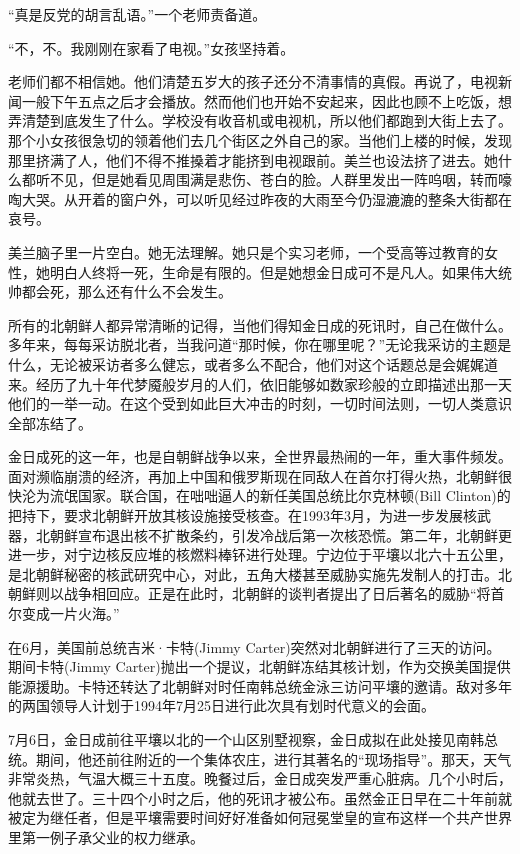 “真是反党的胡言乱语。”一个老师责备道。

“不，不。我刚刚在家看了电视。”女孩坚持着。

老师们都不相信她。他们清楚五岁大的孩子还分不清事情的真假。再说了，电视新闻一般下午五点之后才会播放。然而他们也开始不安起来，因此也顾不上吃饭，想弄清楚到底发生了什么。学校没有收音机或电视机，所以他们都跑到大街上去了。那个小女孩很急切的领着他们去几个街区之外自己的家。当他们上楼的时候，发现那里挤满了人，他们不得不推搡着才能挤到电视跟前。美兰也设法挤了进去。她什么都听不见，但是她看见周围满是悲伤、苍白的脸。人群里发出一阵呜咽，转而嚎啕大哭。从开着的窗户外，可以听见经过昨夜的大雨至今仍湿漉漉的整条大街都在哀号。

美兰脑子里一片空白。她无法理解。她只是个实习老师，一个受高等过教育的女性，她明白人终将一死，生命是有限的。但是她想金日成可不是凡人。如果伟大统帅都会死，那么还有什么不会发生。

所有的北朝鲜人都异常清晰的记得，当他们得知金日成的死讯时，自己在做什么。多年来，每每采访脱北者，当我问道“那时候，你在哪里呢？”无论我采访的主题是什么，无论被采访者多么健忘，或者多么不配合，他们对这个话题总是会娓娓道来。经历了九十年代梦魇般岁月的人们，依旧能够如数家珍般的立即描述出那一天他们的一举一动。在这个受到如此巨大冲击的时刻，一切时间法则，一切人类意识全部冻结了。

金日成死的这一年，也是自朝鲜战争以来，全世界最热闹的一年，重大事件频发。面对濒临崩溃的经济，再加上中国和俄罗斯现在同敌人在首尔打得火热，北朝鲜很快沦为流氓国家。联合国，在咄咄逼人的新任美国总统比尔克林顿(Bill Clinton)的把持下，要求北朝鲜开放其核设施接受核查。在1993年3月，为进一步发展核武器，北朝鲜宣布退出核不扩散条约，引发冷战后第一次核恐慌。第二年，北朝鲜更进一步，对宁边核反应堆的核燃料棒钚进行处理。宁边位于平壤以北六十五公里，是北朝鲜秘密的核武研究中心，对此，五角大楼甚至威胁实施先发制人的打击。北朝鲜则以战争相回应。正是在此时，北朝鲜的谈判者提出了日后著名的威胁“将首尔变成一片火海。”

在6月，美国前总统吉米·卡特(Jimmy Carter)突然对北朝鲜进行了三天的访问。期间卡特(Jimmy Carter)抛出一个提议，北朝鲜冻结其核计划，作为交换美国提供能源援助。卡特还转达了北朝鲜对时任南韩总统金泳三访问平壤的邀请。敌对多年的两国领导人计划于1994年7月25日进行此次具有划时代意义的会面。

7月6日，金日成前往平壤以北的一个山区别墅视察，金日成拟在此处接见南韩总统。期间，他还前往附近的一个集体农庄，进行其著名的“现场指导”。那天，天气非常炎热，气温大概三十五度。晚餐过后，金日成突发严重心脏病。几个小时后，他就去世了。三十四个小时之后，他的死讯才被公布。虽然金正日早在二十年前就被定为继任者，但是平壤需要时间好好准备如何冠冕堂皇的宣布这样一个共产世界里第一例子承父业的权力继承。

